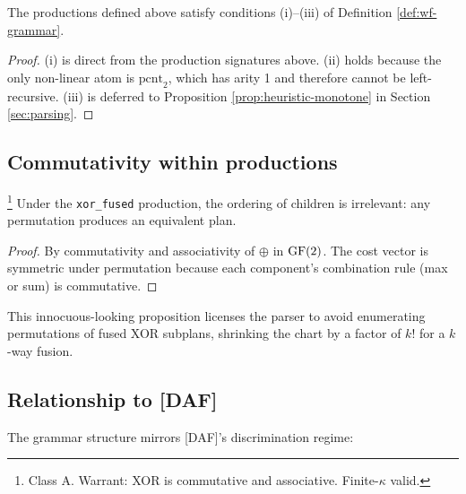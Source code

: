 \begin{proposition}
  \label{prop:base-wf}
  The productions defined above satisfy conditions
  (i)--(iii) of Definition \ref{def:wf-grammar}.
\end{proposition}

\begin{proof}
  (i) is direct from the production signatures above.
  (ii) holds because the only non-linear atom is
  $\mathrm{pcnt}_2$, which has arity 1 and therefore
  cannot be left-recursive. (iii) is deferred to
  Proposition \ref{prop:heuristic-monotone} in
  Section \ref{sec:parsing}.
\end{proof}

\subsection{Commutativity within productions}

\begin{proposition}
  \label{prop:xor-commute}
  \footnote{Class \textsf{A}. Warrant: XOR is
  commutative and associative. Finite-$\kappa$ valid.}
  Under the \texttt{xor\_fused} production, the
  ordering of children is irrelevant: any permutation
  produces an equivalent plan.
\end{proposition}

\begin{proof}
  By commutativity and associativity of $\oplus$ in
  $\operatorname{GF}(2)$. The cost vector is symmetric under
  permutation because each component's combination
  rule (max or sum) is commutative.
\end{proof}

This innocuous-looking proposition licenses the
parser to avoid enumerating permutations of fused
XOR subplans, shrinking the chart by a factor of
$k!$ for a $k$-way fusion.

\subsection{Relationship to [DAF]}

The grammar structure mirrors [DAF]'s discrimination
regime:

